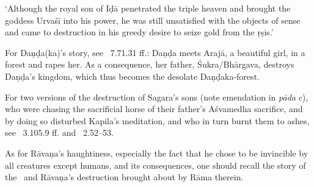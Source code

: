 {{ 
  `Although the royal son of Iḍā penetrated the triple heaven and brought
  the goddess Urvaśī into his power, he was still unsatisfied with the 
  objects of sense and came to destruction in his greedy desire to seize
  gold from the ṛṣis.'
  
 
  For Daṇḍa{\rm (}ka{\rm )}'s story, see \RAMAYANA\ 7.71.31 ff.:
  Daṇḍa meets Arajā, a beautiful girl, in a forest and rapes her. As a consequence, 
  her father, Śukra/Bhārgava, destroys Daṇḍa's kingdom, which thus
  becomes the desolate Daṇḍaka-forest.
 
  
 
  For two versions of the destruction of
  Sagara's sons {\rm (}note emendation in \textit{pāda} c{\rm )}, 
  who were chasing the sacrificial horse of their father's Aśvamedha sacrifice,
  and by doing so disturbed Kapila's meditation, and who in turn burnt them to ashes,
  see \MBH\ 3.105.9 ff. and \BRAHMANDAPUR\ 2.52--53.
 
  
 
  As for Rāvaṇa's haughtiness,
  especially the fact that he chose to be invincible by all creatures except humans,
  and its consequences,
  one should recall the story of the \RAMAYANA\ and Rāvaṇa's destruction brought about by Rāma therein.
 }}


